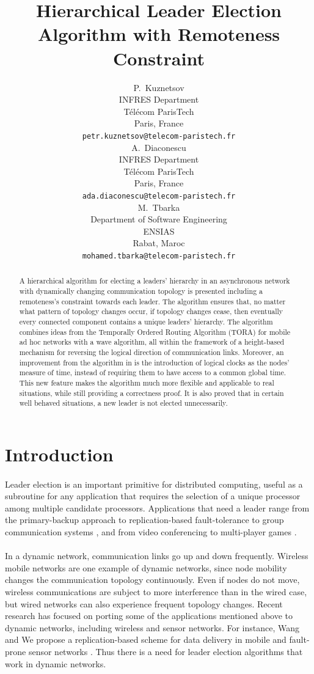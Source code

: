 \documentclass{article}
\title{Hierarchical Leader Election Algorithm with Remoteness Constraint}
\author{
  P.~Kuznetsov \\
  INFRES Department\\
  Télécom ParisTech\\
  Paris, France \\
  \texttt{petr.kuznetsov@telecom-paristech.fr} \\
  \And
  A.~Diaconescu \\
  INFRES Department\\
  Télécom ParisTech\\
  Paris, France \\
  \texttt{ada.diaconescu@telecom-paristech.fr} \\
  \And
  M.~Tbarka \\
  Department of Software Engineering\\
  ENSIAS\\
  Rabat, Maroc \\
  \texttt{mohamed.tbarka@telecom-paristech.fr} \\
}
\begin{document}
\maketitle

\begin{abstract}
A hierarchical algorithm for electing a leaders' hierarchy in an asynchronous network with dynamically changing communication topology is presented including a remoteness's constraint towards each leader. The algorithm ensures that, no matter what pattern of topology changes occur, if topology changes cease, then eventually every connected component contains a unique leaders' hierarchy. The algorithm combines ideas from the Temporally Ordered Routing Algorithm (TORA) for mobile ad hoc networks with a wave algorithm, all within the framework of a height-based mechanism for reversing the logical direction of communication links. Moreover, an improvement from the algorithm in is the introduction of logical clocks as the nodes’ measure of time, instead of requiring them to have access to a common global time. This new feature makes the algorithm much more flexible and applicable to real situations, while still providing a correctness proof. It is also proved that in certain well behaved situations, a new leader is not elected unnecessarily.
\end{abstract}



\section{Introduction}
\paragraph{}Leader election is an important primitive for distributed computing, useful as a subroutine for any application that requires the selection of a unique processor among multiple candidate processors. Applications that need a leader range from the primary-backup approach to replication-based fault-tolerance to group communication systems \cite{1}, and from video conferencing to multi-player games \cite{8}.

\paragraph{}In a dynamic network, communication links go up and down frequently. Wireless mobile networks are one example of dynamic networks, since node mobility changes the communication topology continuously. Even if nodes do not move, wireless communications are subject to more interference than in the wired case, but wired networks can also experience frequent topology changes. Recent research has focused on porting some of the applications mentioned above to dynamic networks, including wireless and sensor networks. For instance, Wang and We propose a replication-based scheme for data delivery in mobile and fault-prone sensor networks \cite{24}. Thus there is a need for leader election algorithms that work in dynamic networks.
\end{document}
